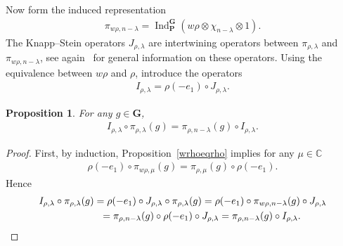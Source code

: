 \documentclass[pdftex]{sigma}
\DeclareMathOperator{\Ind}{Ind}
\numberwithin{equation}{section}
\newtheorem{prop}[theor]{Proposition}
\begin{document}
Now form the induced representation
\begin{gather*}
\pi_{w \rho, n-\lambda} =\Ind_\mathbf P^\mathbf G (w\rho\otimes \chi_{n-\lambda}\otimes 1) .
\end{gather*}
The Knapp--Stein operators $J_{\rho, \lambda}$ are intertwining operators between $\pi_{ \rho, \lambda}$ and $\pi_{w \rho, n-\lambda}$, see again~\cite{kn} for general information on these operators. Using the equivalence between $w \rho$ and $ \rho$, introduce the operators
\begin{gather*}
I_{ \rho, \lambda} = \rho(-e_1)\circ J_{ \rho, \lambda} .
\end{gather*}

\begin{prop} For any $g\in \mathbf G$,
\begin{gather*}
I_{ \rho,\lambda}\circ \pi_{ \rho,\lambda}(g) = \pi_{ \rho, n-\lambda}(g) \circ I_{ \rho,\lambda} .
\end{gather*}
\end{prop}

\begin{proof}
First, by induction, Proposition~\ref{wrhoeqrho} implies for any $\mu\in \mathbb C$
\begin{gather*}
\rho(-e_1) \circ \pi_{w \rho,\mu}(g) = \pi_{ \rho,\mu}(g)\circ \rho(-e_1) .
\end{gather*}
Hence
\begin{gather*}
I_{\rho,\lambda}\circ\pi_{\rho,\lambda}(g) = \rho(-e_1) \circ J_{\rho,\lambda}\circ \pi_{\rho,\lambda}(g) = \rho(-e_1)\circ \pi_{w \rho, n-\lambda}(g) \circ J_{\rho,\lambda}
\\ \hphantom{I_{ \rho,\lambda}\circ\pi_{\rho,\lambda}(g) }
{}=\pi_{ \rho,n-\lambda}(g) \circ \rho(-e_1)\circ J_{\rho,\lambda} = \pi_{\rho, n-\lambda}(g) \circ I_{\rho,\lambda}. \tag*{\qed}
\end{gather*}
\renewcommand{\qed}{}
\end{proof}
\end{document}
